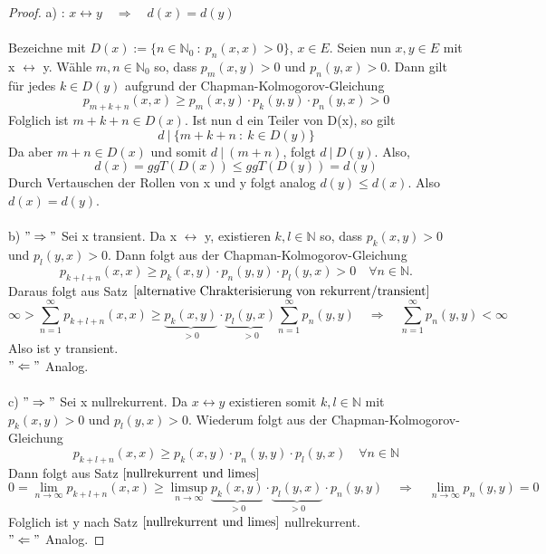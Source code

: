 \documentclass[a4paper,12pt]{scrartcl}
\theoremstyle{definition}
\begin{document}
\begin{proof}
a) : $x \leftrightarrow y \quad \Rightarrow \quad d(x) = d(y)$
\\
\\
Bezeichne mit $D(x) := \lbrace n \in \mathbb{N}_{0} \: : \: p_{n}(x,x)>0 \rbrace$, $x \in E$. Seien nun $x,y \in E$ mit x $\leftrightarrow$ y. Wähle $m,n \in \mathbb{N}_{0}$ so, dass $p_{m}(x,y)>0$ und $p_{n}(y,x)>0$. Dann gilt für jedes $k \in D(y)$ aufgrund der Chapman-Kolmogorov-Gleichung
\begin{equation*}
p_{m+k+n}(x,x) \geq p_{m}(x,y) \cdot p_{k}(y,y) \cdot p_{n}(y,x) > 0
\end{equation*}
Folglich ist $m+k+n \in D(x)$. Ist nun d ein Teiler von D(x), so gilt
\begin{equation*}
 d \: | \: \lbrace m+k+n \: : \: k \in D(y) \rbrace
\end{equation*} 
Da aber $m+n \in D(x)$ und somit $d \: | \: (m+n)$, folgt $d \: | \: D(y)$. Also, 
\begin{equation*}
d(x) = ggT(D(x)) \leq ggT(D(y)) = d(y)
\end{equation*}
Durch Vertauschen der Rollen von x und y folgt analog $d(y) \leq d(x)$. Also $d(x) = d(y)$.
\\
\\
b) $"\Rightarrow"$ Sei x transient. Da x $\leftrightarrow$ y, existieren $k,l \in \mathbb{N}$ so, dass  $p_{k}(x,y)>0$ und $p_{l}(y,x)>0$. Dann folgt aus der Chapman-Kolmogorov-Gleichung
\begin{equation*}
p_{k+l+n}(x,x) \geq p_{k}(x,y) \cdot p_{n}(y,y) \cdot p_{l}(y,x) > 0 \quad \forall n \in \mathbb{N}.
\end{equation*}
Daraus folgt aus Satz $\ref{alternative Chrakterisierung von rekurrent/transient}$ 
\begin{equation*}
\infty > \sum_{n=1}^{\infty} p_{k+l+n}(x,x) \geq \underbrace{p_{k}(x,y)}_{>0} \cdot \underbrace{p_{l}(y,x)}_{>0} \sum_{n=1}^{\infty} p_{n}(y,y) \quad \Rightarrow \quad \sum_{n=1}^{\infty} p_{n}(y,y) < \infty
\end{equation*}
Also ist y transient.
\\
$"\Leftarrow"$ Analog.
\\
\\
c) \: $"\Rightarrow"$ Sei x nullrekurrent. Da $x \leftrightarrow y$ existieren somit $k,l \in \mathbb{N}$ mit $p_{k}(x,y) > 0$ und $p_{l}(y,x) > 0$. Wiederum folgt aus der Chapman-Kolmogorov-Gleichung
\begin{equation*}
p_{k+l+n}(x,x) \geq p_{k}(x,y) \cdot p_{n}(y,y) \cdot p_{l}(y,x) \quad \forall n \in \mathbb{N}
\end{equation*}
Dann folgt aus Satz $\ref{nullrekurrent und limes}$
\begin{equation*}
0 = \lim_{n \to \infty}p_{k+l+n}(x,x) \geq \limsup_{n \to \infty} \underbrace{p_{k}(x,y)}_{>0} \cdot \underbrace{p_{l}(y,x)}_{>0} \cdot p_{n}(y,y) \quad \Rightarrow \quad \lim_{n \to \infty} p_{n}(y,y) = 0
\end{equation*}
Folglich ist y nach Satz $\ref{nullrekurrent und limes}$ nullrekurrent.
\\
$"\Leftarrow"$ Analog.
\end{proof}
\end{document}
